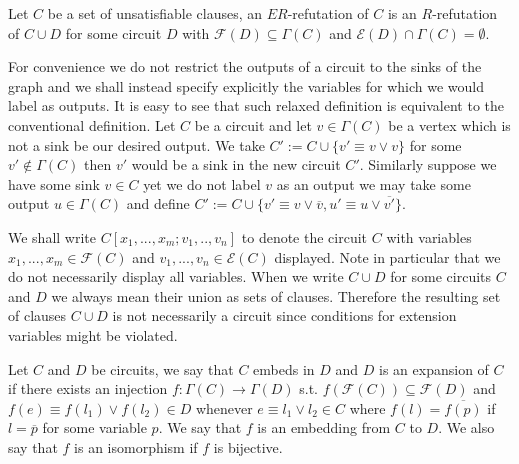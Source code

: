 \documentclass{LMCS}
\theoremstyle{plain}\newtheorem{satz}[thm]{Satz}
\begin{document}
\begin{defi}
Let $C$ be a set of unsatisfiable clauses, an $ER$-refutation of $C$ is an $R$-refutation of $C \cup D$ for some circuit $D$ with ${\mathcal F}(D) \subseteq \Gamma(C)$ and ${\mathcal E}(D) \cap \Gamma(C) = \emptyset$.
\end{defi}

For convenience we do not restrict the outputs of a circuit to the sinks of the graph and we shall instead specify explicitly the variables for which we would label as outputs. It is easy to see that such relaxed definition is equivalent to the conventional definition. Let $C$ be a circuit and let $v \in \Gamma(C)$ be a vertex which is not a sink be our desired output. We take $C' := C \cup \{ v' \equiv v \lor v \}$ for some $v' \notin \Gamma(C)$ then $v'$ would be a sink in the new circuit $C'$. Similarly suppose we have some sink $v \in C$ yet we do not label $v$ as an output we may take some output $u \in \Gamma(C)$ and define $C' := C \cup \{ v' \equiv v \lor \overline{v}, u' \equiv u \lor \overline{v'} \}$.

We shall write $C[x_1,...,x_m;v_1,..,v_n]$ to denote the circuit $C$ with variables $x_1,...,x_m \in {\mathcal F}(C)$ and $v_1,...,v_n \in {\mathcal E}(C)$ displayed. Note in particular that we do not necessarily display all variables. When we write $C \cup D$ for some circuits $C$ and $D$ we always mean their union as sets of clauses. Therefore the resulting set of clauses $C \cup D$ is not necessarily a circuit since conditions for extension variables might be violated.

\begin{defi}
Let $C$ and $D$ be circuits, we say that $C$ embeds in $D$ and $D$ is an expansion of $C$ if there exists an injection $f: \Gamma(C) \longrightarrow \Gamma(D)$ s.t. $f({\mathcal F}(C)) \subseteq {\mathcal F}(D)$ and $f(e) \equiv f(l_1) \lor f(l_2) \in D$ whenever $e \equiv l_1 \lor l_2 \in C$ where $f(l)=\overline{f(p)}$ if $l=\overline{p}$ for some variable $p$. We say that $f$ is an embedding from $C$ to $D$. We also say that $f$ is an isomorphism if $f$ is bijective.
\end{defi}
\end{document}
